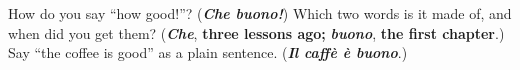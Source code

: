 \begin{tcolorbox}[breakable,colback=teal!4,colframe=teal!35!black,title={Before you move on}]
How do you say \textquotedblleft{}how good!\textquotedblright{}? (\emph{\textbf{Che buono!}}) Which two words is it made of, and when did you get them? (\emph{\textbf{Che}}, \textbf{three lessons ago;} \emph{\textbf{buono}}, \textbf{the first chapter}.) Say \textquotedblleft{}the coffee is good\textquotedblright{} as a plain sentence. (\emph{\textbf{Il caffè è buono}}.)
\end{tcolorbox}
